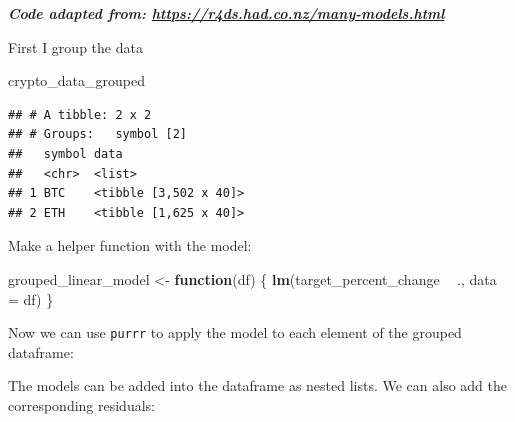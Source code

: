 \documentclass[
]{book}
\newenvironment{Shaded}{\begin{snugshade}}{\end{snugshade}}
\newcommand{\ControlFlowTok}[1]{\textcolor[rgb]{0.13,0.29,0.53}{\textbf{#1}}}
\newcommand{\DataTypeTok}[1]{\textcolor[rgb]{0.13,0.29,0.53}{#1}}
\newcommand{\KeywordTok}[1]{\textcolor[rgb]{0.13,0.29,0.53}{\textbf{#1}}}
\newcommand{\NormalTok}[1]{#1}
\newcommand{\OperatorTok}[1]{\textcolor[rgb]{0.81,0.36,0.00}{\textbf{#1}}}
\newcommand{\StringTok}[1]{\textcolor[rgb]{0.31,0.60,0.02}{#1}}
\begin{document}
\textbf{\emph{Code adapted from: \url{https://r4ds.had.co.nz/many-models.html}}}

First I group the data

\begin{Shaded}
\end{Shaded}

\begin{Shaded}
\begin{Highlighting}[]
\NormalTok{crypto_data_grouped}
\end{Highlighting}
\end{Shaded}

\begin{verbatim}
## # A tibble: 2 x 2
## # Groups:   symbol [2]
##   symbol data                 
##   <chr>  <list>               
## 1 BTC    <tibble [3,502 x 40]>
## 2 ETH    <tibble [1,625 x 40]>
\end{verbatim}

Make a helper function with the model:

\begin{Shaded}
\begin{Highlighting}[]
\NormalTok{grouped_linear_model <-}\StringTok{ }\ControlFlowTok{function}\NormalTok{(df) \{}
  \KeywordTok{lm}\NormalTok{(target_percent_change }\OperatorTok{~}\StringTok{ }\NormalTok{., }\DataTypeTok{data =}\NormalTok{ df)}
\NormalTok{\}}
\end{Highlighting}
\end{Shaded}

Now we can use \texttt{purrr}\citep{R-purrr} to apply the model to each element of the grouped dataframe:

\begin{Shaded}
\end{Shaded}

The models can be added into the dataframe as nested lists. We can also add the corresponding residuals:
\end{document}

